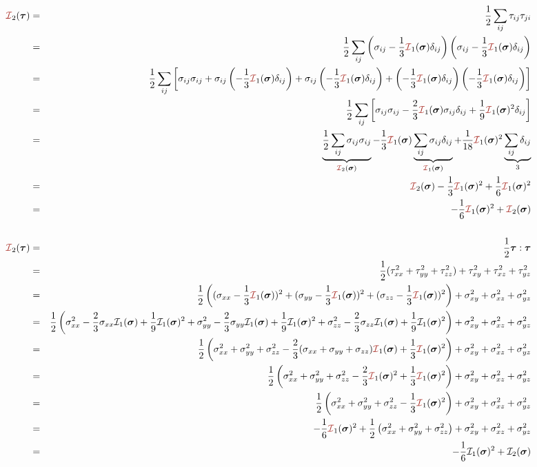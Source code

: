 \begin{eqnarray}
{\III}_2(\bm \tau)
&=& \frac12 \sum_{ij} \tau_{ij}\tau_{ji}  \nn\\
&=& \frac12 \sum_{ij} 
\left(\sigma_{ij}-\frac13 {\III}_1(\bm\sigma) \delta_{ij}\right)
\left(\sigma_{ij}-\frac13 {\III}_1(\bm\sigma) \delta_{ij}\right) \nn\\
&=& \frac12 \sum_{ij} 
\left[
\sigma_{ij}\sigma_{ij} 
+
\sigma_{ij}
\left(-\frac13 {\III}_1(\bm\sigma) \delta_{ij}\right)
+
\sigma_{ij}
\left(-\frac13 {\III}_1(\bm\sigma) \delta_{ij}\right)
+
\left(-\frac13 {\III}_1(\bm\sigma) \delta_{ij}\right)
\left(-\frac13 {\III}_1(\bm\sigma) \delta_{ij}\right) 
\right] \nn\\
&=& \frac12 \sum_{ij} 
\left[
\sigma_{ij}\sigma_{ij} 
-\frac23
{\III}_1(\bm\sigma) 
\sigma_{ij}
\delta_{ij}
+
\frac19 {\III}_1(\bm\sigma)^2 \delta_{ij}
\right] \nn\\
&=& 
\underbrace{\frac12 \sum_{ij} \sigma_{ij}\sigma_{ij} }_{{\III}_2(\bm\sigma)}
-\frac13
{\III}_1(\bm\sigma) 
\underbrace{\sum_{ij}  \sigma_{ij}  \delta_{ij}}_{{\III}_1(\bm\sigma)}
+
\frac{1}{18}
{\III}_1(\bm\sigma)^2 
\underbrace{\sum_{ij} \delta_{ij}}_{3} \nn\\
&=& {\III}_2(\bm\sigma)
- \frac13  {\III}_1(\bm\sigma)^2 + \frac16  {\III}_1(\bm\sigma)^2 \nn\\
&=& -\frac16  {\III}_1(\bm\sigma)^2 +  {\III}_2(\bm\sigma)
\nn\\
\nn\\
{\III}_2(\bm\tau) 
&=& \frac12 \bm\tau:\bm\tau \nn\\
&=& \frac12 ( \tau_{xx}^2 + \tau_{yy}^2 +\tau_{zz}^2)  + \tau_{xy}^2+ \tau_{xz}^2+ \tau_{yz}^2 \nn\\
&=& \frac12 \left(
(\sigma_{xx}-\frac13{\III}_1(\bm\sigma))^2 + 
(\sigma_{yy}-\frac13{\III}_1(\bm\sigma))^2 + 
(\sigma_{zz}-\frac13{\III}_1(\bm\sigma))^2  
\right)
+ \sigma_{xy}^2+ \sigma_{xz}^2+ \sigma_{yz}^2 \nn\\
&=& \frac12 \left(
\sigma_{xx}^2-\frac23\sigma_{xx}{\cal I}_1(\bm\sigma) + \frac19 {\cal I}_1(\bm\sigma)^2+
\sigma_{yy}^2-\frac23\sigma_{yy}{\cal I}_1(\bm\sigma) + \frac19 {\cal I}_1(\bm\sigma)^2+
\sigma_{zz}^2-\frac23\sigma_{zz}{\cal I}_1(\bm\sigma) + \frac19 {\cal I}_1(\bm\sigma)^2
\right)
+ \sigma_{xy}^2+ \sigma_{xz}^2+ \sigma_{yz}^2 \nn\\
&=& \frac12 \left(
\sigma_{xx}^2 + \sigma_{yy}^2 + \sigma_{zz}^2
-\frac23(\sigma_{xx}+\sigma_{yy}+\sigma_{zz})
{\III}_1(\bm\sigma) + \frac13 {\III}_1(\bm\sigma)^2
\right)
+ \sigma_{xy}^2+ \sigma_{xz}^2+ \sigma_{yz}^2 \nn\\
&=& \frac12 \left(
\sigma_{xx}^2 + \sigma_{yy}^2 + \sigma_{zz}^2
-\frac23
{\III}_1(\bm\sigma)^2 + \frac13 {\III}_1(\bm\sigma)^2
\right)
+ \sigma_{xy}^2+ \sigma_{xz}^2+ \sigma_{yz}^2 \nn\\
&=& 
\frac12 \left(
\sigma_{xx}^2 + \sigma_{yy}^2 + \sigma_{zz}^2
-\frac13 {\III}_1(\bm\sigma)^2 
\right)
+ \sigma_{xy}^2+ \sigma_{xz}^2+ \sigma_{yz}^2 \nn\\
&=&
-\frac16 {\III}_1(\bm\sigma)^2 + 
\frac12 \left(
\sigma_{xx}^2 + \sigma_{yy}^2 + \sigma_{zz}^2
\right)
+ \sigma_{xy}^2+ \sigma_{xz}^2+ \sigma_{yz}^2 \nn\\
&=&
-\frac16 {\cal I}_1(\bm\sigma)^2 + {\cal I}_2(\bm\sigma)
\end{eqnarray}
